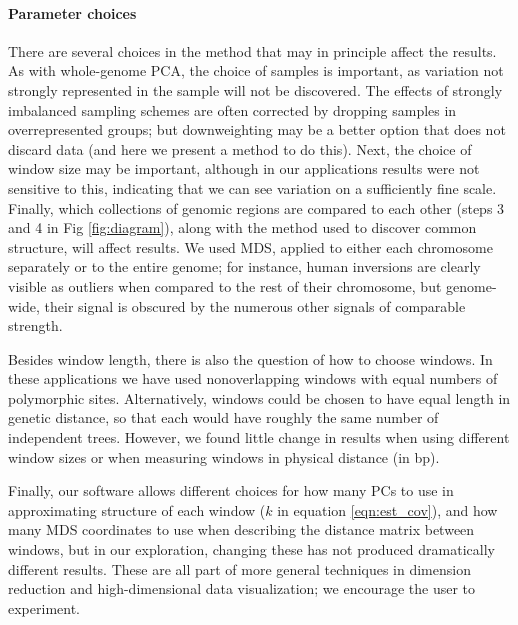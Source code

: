 \documentclass[11pt, oneside]{article}   	%
\newcommand\citep{\cite}
\newcommand{\Figure}{Fig }
\newcommand{\Figure}{{Figure }}
\begin{document}
\paragraph{Parameter choices}
There are several choices in the method that may in principle affect the results.
As with whole-genome PCA,
the choice of samples is important,
as variation not strongly represented in the sample will not be discovered.
The effects of strongly imbalanced sampling schemes are often corrected by dropping samples in overrepresented groups;
but downweighting may be a better option that does not discard data
(and here we present a method to do this).
Next, the choice of window size may be important,
although in our applications results were not sensitive to this,
indicating that we can see variation on a sufficiently fine scale.
Finally, which collections of genomic regions are compared to each other (steps 3 and 4 in \Figure \ref{fig:diagram}),
along with the method used to discover common structure,
will affect results.
We used MDS, applied to either each chromosome separately or to the entire genome;
for instance, human inversions are clearly visible as outliers when compared to the rest of their chromosome,
but genome-wide, their signal is obscured by the numerous other signals of comparable strength.

Besides window length, there is also the question of how to choose windows.
In these applications we have used nonoverlapping windows with equal numbers of polymorphic sites.
Alternatively, windows could be chosen to have equal length in genetic distance,
so that each would have roughly the same number of independent trees.
However, we found little change in results when using different window sizes
or when measuring windows in physical distance (in bp).


Finally, our software allows different choices for how many PCs to use in approximating structure of each window ($k$ in equation \ref{eqn:est_cov}),
and how many MDS coordinates to use when describing the distance matrix between windows,
but in our exploration, changing these has not produced dramatically different results.
These are all part of more general techniques in dimension reduction and high-dimensional data visualization;
we encourage the user to experiment.
\end{document}
